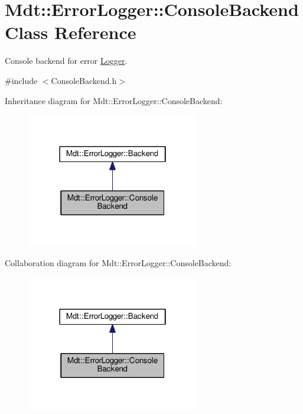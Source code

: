 \hypertarget{class_mdt_1_1_error_logger_1_1_console_backend}{}\section{Mdt\+:\+:Error\+Logger\+:\+:Console\+Backend Class Reference}
\label{class_mdt_1_1_error_logger_1_1_console_backend}


Console backend for error \hyperlink{class_mdt_1_1_error_logger_1_1_logger}{Logger}.  




{\ttfamily \#include $<$Console\+Backend.\+h$>$}



Inheritance diagram for Mdt\+:\+:Error\+Logger\+:\+:Console\+Backend\+:
\nopagebreak
\begin{figure}[H]
\begin{center}
\leavevmode
\includegraphics[width=214pt]{class_mdt_1_1_error_logger_1_1_console_backend__inherit__graph}
\end{center}
\end{figure}


Collaboration diagram for Mdt\+:\+:Error\+Logger\+:\+:Console\+Backend\+:
\nopagebreak
\begin{figure}[H]
\begin{center}
\leavevmode
\includegraphics[width=214pt]{class_mdt_1_1_error_logger_1_1_console_backend__coll__graph}
\end{center}
\end{figure}
